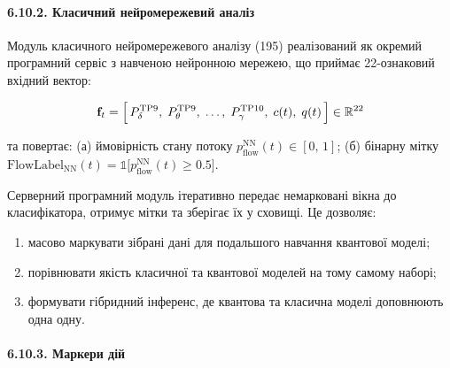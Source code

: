 \documentclass[12pt,a4paper]{article}
\begin{document}
\paragraph{6.10.2. Класичний нейромережевий аналіз}\label{ux43aux43bux430ux441ux438ux447ux43dux438ux439-ux43dux435ux439ux440ux43eux43cux435ux440ux435ux436ux435ux432ux438ux439-ux430ux43dux430ux43bux456ux437}



Модуль класичного нейромережевого аналізу (195) реалізований як окремий програмний сервіс з навченою нейронною мережею, що приймає 22-ознаковий вхідний вектор:



\[\mathbf{f}_t = \Bigl[\,P_\delta^{\text{TP9}},\;P_\theta^{\text{TP9}},\;\ldots,\;P_\gamma^{\text{TP10}},\;c(t),\;q(t)\,\Bigr] \in \mathbb{R}^{22}\]



та повертає: (а) ймовірність стану потоку \(p_{\text{flow}}^{\text{NN}}(t) \in [0,\,1]\); (б) бінарну мітку \(\text{FlowLabel}_{\text{NN}}(t) = \mathbb{1}\bigl[p_{\text{flow}}^{\text{NN}}(t) \geq 0.5\bigr]\).



Серверний програмний модуль ітеративно передає немарковані вікна до класифікатора, отримує мітки та зберігає їх у сховищі. Це дозволяє:



\begin{enumerate}

\def\labelenumi{\arabic{enumi}.}

\tightlist

\item

  масово маркувати зібрані дані для подальшого навчання квантової моделі;

\item

  порівнювати якість класичної та квантової моделей на тому самому наборі;

\item

  формувати гібридний інференс, де квантова та класична моделі доповнюють одна одну.

\end{enumerate}



\paragraph{6.10.3. Маркери дій}\label{ux43cux430ux440ux43aux435ux440ux438-ux434ux456ux439}
\end{document}
